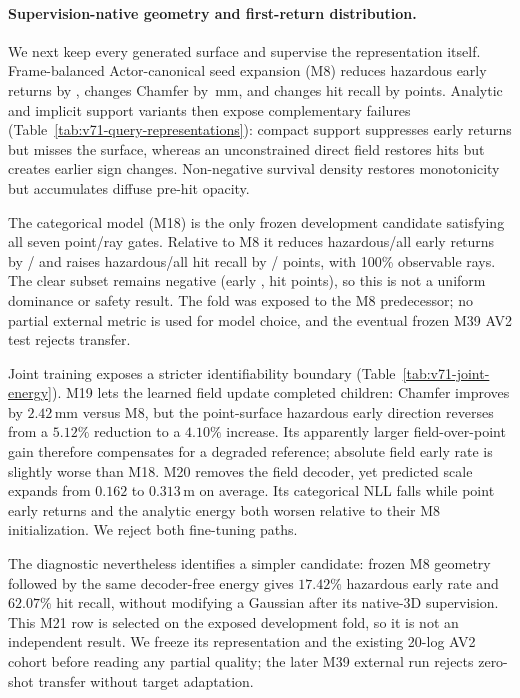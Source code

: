 \paragraph{Supervision-native geometry and first-return distribution.}
We next keep every generated surface and supervise the representation itself. Frame-balanced Actor-canonical seed expansion (M8) reduces hazardous early returns by \VSevenOneMEightHazardEarlyReduction{}, changes Chamfer by \VSevenOneMEightChamferDeltaMm{}\,mm, and changes hit recall by \VSevenOneMEightHitRecallDeltaPp{} points. Analytic and implicit support variants then expose complementary failures (Table~\ref{tab:v71-query-representations}): compact support suppresses early returns but misses the surface, whereas an unconstrained direct field restores hits but creates earlier sign changes. Non-negative survival density restores monotonicity but accumulates diffuse pre-hit opacity.

The categorical model (M18) is the only frozen development candidate satisfying all seven point/ray gates. Relative to M8 it reduces hazardous/all early returns by \VSevenOneMEighteenHazardEarlyReduction{}/\VSevenOneMEighteenAllEarlyReduction{} and raises hazardous/all hit recall by \VSevenOneMEighteenHazardHitDeltaPp{}/\VSevenOneMEighteenAllHitDeltaPp{} points, with 100\% observable rays. The clear subset remains negative (early \VSevenOneMEighteenClearEarlyReduction{}, hit \VSevenOneMEighteenClearHitDeltaPp{} points), so this is not a uniform dominance or safety result. The fold was exposed to the M8 predecessor; no partial external metric is used for model choice, and the eventual frozen M39 AV2 test rejects transfer.



Joint training exposes a stricter identifiability boundary (Table~\ref{tab:v71-joint-energy}). M19 lets the learned field update completed children: Chamfer improves by $2.42$\,mm versus M8, but the point-surface hazardous early direction reverses from a $5.12\%$ reduction to a $4.10\%$ increase. Its apparently larger field-over-point gain therefore compensates for a degraded reference; absolute field early rate is slightly worse than M18. M20 removes the field decoder, yet predicted scale expands from $0.162$ to $0.313$\,m on average. Its categorical NLL falls while point early returns and the analytic energy both worsen relative to their M8 initialization. We reject both fine-tuning paths.

The diagnostic nevertheless identifies a simpler candidate: frozen M8 geometry followed by the same decoder-free energy gives $17.42\%$ hazardous early rate and $62.07\%$ hit recall, without modifying a Gaussian after its native-3D supervision. This M21 row is selected on the exposed development fold, so it is not an independent result. We freeze its representation and the existing 20-log AV2 cohort before reading any partial quality; the later M39 external run rejects zero-shot transfer without target adaptation.

